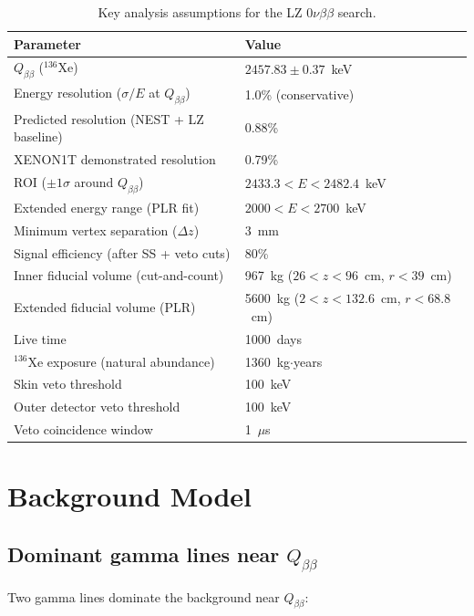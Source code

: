 \documentclass[11pt]{article}
\begin{document}
\begin{table}[h]
\centering
\caption{Key analysis assumptions for the LZ $0\nu\beta\beta$ search.}
\label{tab:assumptions}
\begin{tabular}{@{}ll@{}}
\toprule
Parameter & Value \\
\midrule
$Q_{\beta\beta}$ ($^{136}$Xe) & $2457.83 \pm 0.37$~keV \\
Energy resolution ($\sigma/E$ at $Q_{\beta\beta}$) & 1.0\% (conservative) \\
Predicted resolution (NEST + LZ baseline) & 0.88\% \\
XENON1T demonstrated resolution & 0.79\% \\
ROI ($\pm 1\sigma$ around $Q_{\beta\beta}$) & $2433.3 < E < 2482.4$~keV \\
Extended energy range (PLR fit) & $2000 < E < 2700$~keV \\
Minimum vertex separation ($\Delta z$) & 3~mm \\
Signal efficiency (after SS + veto cuts) & 80\% \\
\midrule
Inner fiducial volume (cut-and-count) & 967~kg ($26 < z < 96$~cm, $r < 39$~cm) \\
Extended fiducial volume (PLR) & 5600~kg ($2 < z < 132.6$~cm, $r < 68.8$~cm) \\
Live time & 1000~days \\
$^{136}$Xe exposure (natural abundance) & 1360~kg$\cdot$years \\
\midrule
Skin veto threshold & 100~keV \\
Outer detector veto threshold & 100~keV \\
Veto coincidence window & 1~$\mu$s \\
\bottomrule
\end{tabular}
\end{table}

\section{Background Model}

\subsection{Dominant gamma lines near $Q_{\beta\beta}$}

Two gamma lines dominate the background near $Q_{\beta\beta}$:
\end{document}
